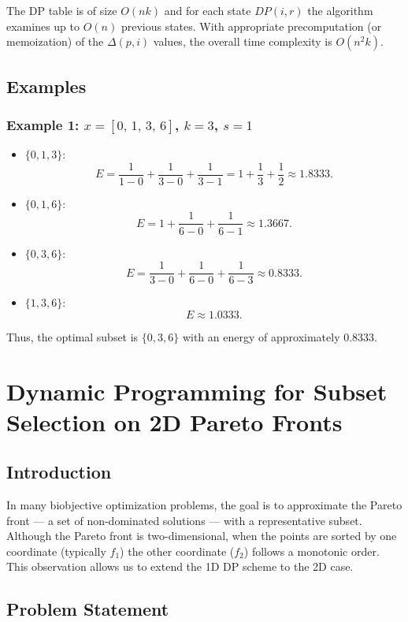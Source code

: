 \documentclass[11pt]{article}
\begin{document}
The DP table is of size \(O(nk)\) and for each state \(DP(i,r)\) the algorithm examines up to \(O(n)\) previous states. With appropriate precomputation (or memoization) of the \(\Delta(p,i)\) values, the overall time complexity is \(O(n^2 k)\).

\subsection{Examples}

\subsubsection*{Example 1: \(x=[0,\,1,\,3,\,6]\), \(k=3\), \(s=1\)}

\begin{itemize}
    \item \(\{0,1,3\}\): 
    \[
    E= \frac{1}{1-0}+\frac{1}{3-0}+\frac{1}{3-1}= 1 + \frac{1}{3} + \frac{1}{2} \approx 1.8333.
    \]
    \item \(\{0,1,6\}\): 
    \[
    E= 1 + \frac{1}{6-0} + \frac{1}{6-1} \approx 1.3667.
    \]
    \item \(\{0,3,6\}\): 
    \[
    E= \frac{1}{3-0} + \frac{1}{6-0} + \frac{1}{6-3} \approx 0.8333.
    \]
    \item \(\{1,3,6\}\):  
    \[
    E \approx 1.0333.
    \]
\end{itemize}

Thus, the optimal subset is \(\{0,3,6\}\) with an energy of approximately \(0.8333\).

\section{Dynamic Programming for Subset Selection on 2D Pareto Fronts}

\subsection{Introduction}

In many biobjective optimization problems, the goal is to approximate the Pareto front --- a set of non-dominated solutions --- with a representative subset. Although the Pareto front is two-dimensional, when the points are sorted by one coordinate (typically \(f_1\)) the other coordinate (\(f_2\)) follows a monotonic order. This observation allows us to extend the 1D DP scheme to the 2D case.

\subsection{Problem Statement}
\end{document}

